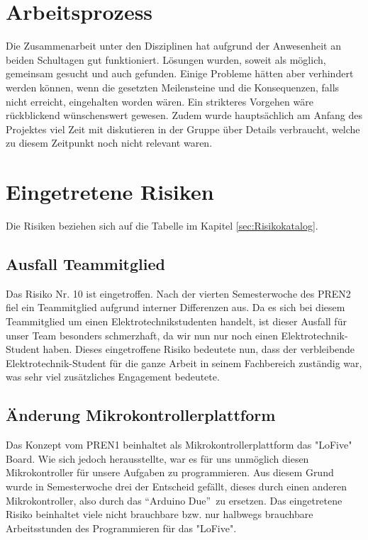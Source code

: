 \documentclass[a4paper]{report}
\begin{document}
\section{Arbeitsprozess}
	Die Zusammenarbeit unter den Disziplinen hat aufgrund der Anwesenheit an beiden Schultagen gut funktioniert. Lösungen wurden, soweit als möglich, gemeinsam gesucht und auch gefunden. Einige Probleme hätten aber verhindert werden können, wenn die gesetzten Meilensteine und die Konsequenzen, falls nicht erreicht, eingehalten worden wären. Ein strikteres Vorgehen wäre rückblickend wünschenswert gewesen. Zudem wurde hauptsächlich am Anfang des Projektes viel Zeit mit diskutieren in der Gruppe über Details verbraucht, welche zu diesem Zeitpunkt noch nicht relevant waren.

\section{Eingetretene Risiken}
\label{ch:EingetreteneRisikos}

Die Risiken beziehen sich auf die Tabelle im Kapitel \ref{sec:Risikokatalog}.

\subsection{Ausfall Teammitglied}
Das Risiko Nr. 10 ist eingetroffen. Nach der vierten Semesterwoche des PREN2 fiel ein Teammitglied aufgrund interner Differenzen aus. Da es sich bei diesem Teammitglied um einen Elektrotechnikstudenten handelt, ist dieser Ausfall für unser Team besonders schmerzhaft, da wir nun nur noch einen Elektrotechnik-Student haben. Dieses eingetroffene Risiko bedeutete nun, dass der verbleibende Elektrotechnik-Student für die ganze Arbeit in seinem Fachbereich zuständig war, was sehr viel zusätzliches Engagement bedeutete.

\subsection{Änderung Mikrokontrollerplattform}
\label{ch:AenderungMikrokontroller}
Das Konzept vom PREN1 beinhaltet als Mikrokontrollerplattform das "LoFive" Board. Wie sich jedoch herausstellte, war es für uns unmöglich diesen Mikrokontroller für unsere Aufgaben zu programmieren. Aus diesem Grund wurde in Semesterwoche drei der Entscheid gefällt, dieses durch einen anderen Mikrokontroller, also durch das \textquotedblleft Arduino Due\textquotedblright\ zu ersetzen. Das eingetretene Risiko beinhaltet viele nicht brauchbare bzw. nur halbwegs brauchbare Arbeitsstunden des Programmieren für das "LoFive".
\end{document}
